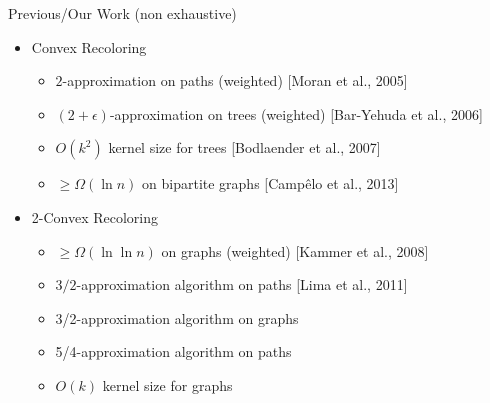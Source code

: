 \def\refsize{\tiny}

\begin{frame}{Previous/\alert{Our} Work (non exhaustive)}
\begin{itemize}
\item
Convex Recoloring
\begin{itemize}

\pause\item
$2$-approximation on paths (weighted)
{\refsize[Moran et al., 2005]}

\pause\item
$(2 + \epsilon)$-approximation on trees (weighted) 
{\refsize[Bar-Yehuda et al., 2006]}

\pause\item
$O(k^2)$ kernel size for trees
{\refsize[Bodlaender et al., 2007]}

\pause\item
$\geq \Omega(\ln{n})$ on bipartite graphs
{\refsize[Camp\^elo et al., 2013]}


\end{itemize}
\pause\item
2-Convex Recoloring
\begin{itemize}


\pause\item
$\geq \Omega(\ln\ln{n})$ on graphs (weighted)
{\refsize[Kammer et al., 2008]}

\pause\item
$3/2$-approximation algorithm on paths
{\refsize[Lima et al., 2011]}

\pause\item
\alert{3/2-approximation algorithm on graphs}

\pause\item
\alert{5/4-approximation algorithm on paths}

\pause\item
\alert{$O(k)$ kernel size for graphs}


\end{itemize}
\end{itemize}
\end{frame}